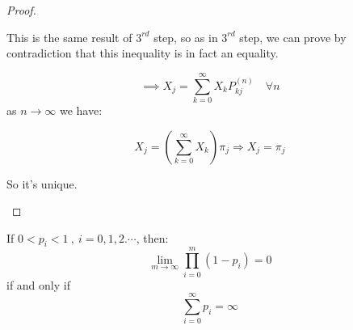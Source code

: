 \begin{proof}
\begin{enumerate}
			This is the same result of $3^{rd}$ step, so as in $3^{rd}$ step, we can prove by contradiction that this inequality is in fact an equality.

			$$ \implies X_j = \sum\limits_{k=0}^\infty X_k P_{kj}^{(n)} \quad \forall n $$
			as $n \to \infty$ we have:

			\begin{equation}
				X_j = (\sum\limits_{k=0}^\infty X_k ) \pi_j \Rightarrow X_j = \pi_j
			\end{equation}

			So it's unique.
		\end{enumerate}
	\end{proof}

	\begin{lemma}
	  If $0 < p_i < 1 ~,~ i=0,1,2.\cdots $, then:
		\begin{equation}\label{limprodpi}
			\lim_{m \to \infty} \prod_{i=0}^{m}(1-p_i) = 0
		\end{equation}
		if and only if
		\begin{equation}\label{pitoinfty}
			\sum\limits_{i=0}^\infty p_i = \infty
		\end{equation}
	\end{lemma}

